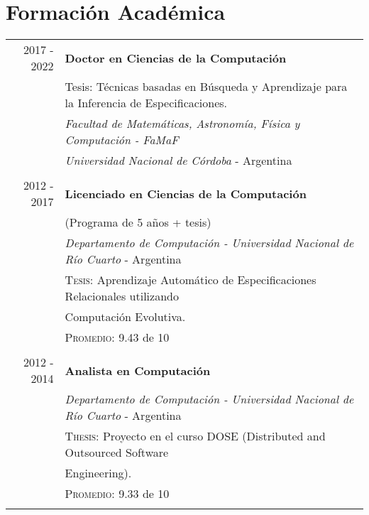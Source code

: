 \documentclass[a4paper,10pt]{article} %
\begin{document}

\section{Formación Académica}

\begin{tabular}{rl}
\\
\textsc{2017 - 2022}	& \textbf{Doctor en Ciencias de la Computación} \\
& Tesis: Técnicas basadas en Búsqueda y Aprendizaje para la Inferencia de Especificaciones. \\
& \textit{Facultad de Matemáticas, Astronomía, Física y Computación - FaMaF} \\ & \textit{Universidad Nacional de Córdoba} - Argentina \\ & \\

\textsc{2012 - 2017}	& \textbf{Licenciado en Ciencias de la Computación} \\
& (Programa de 5 años + tesis) \\
& \textit{Departamento de Computación - Universidad Nacional de Río Cuarto} - Argentina \\ 
& \textsc{Tesis:} Aprendizaje Automático de Especificaciones Relacionales utilizando \\ 
& Computación Evolutiva. \\ 
& \textsc{Promedio:} 9.43 de 10 \\ & \\

\textsc{2012 - 2014}	& \textbf{Analista en Computación} \\
& \textit{Departamento de Computación - Universidad Nacional de Río Cuarto} - Argentina \\
& \textsc{Thesis:} Proyecto en el curso DOSE (Distributed and Outsourced Software \\ 
& Engineering). \\ 
& \textsc{Promedio:} 9.33 de 10 \\ \\ 

\end{tabular}
\end{document}
